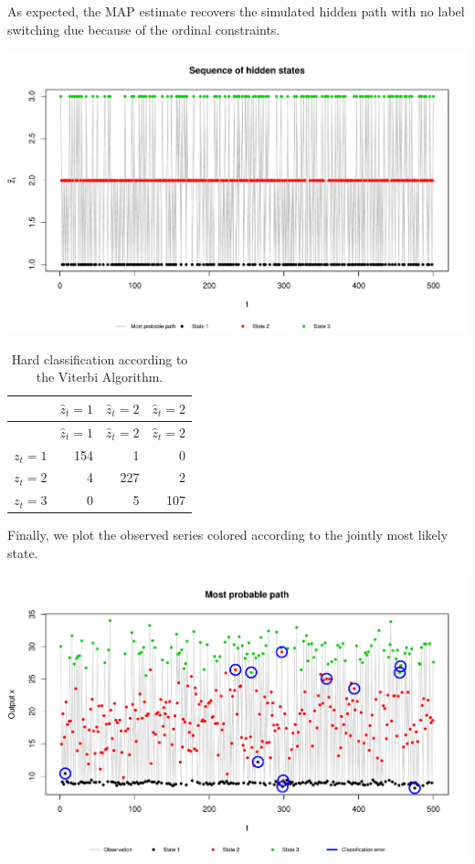 \documentclass[]{article}
\begin{document}
As expected, the MAP estimate recovers the simulated hidden path with no
label switching due because of the ordinal constraints.

\includegraphics[width=\textwidth]{main_pdf_files/figure-latex/hmm_walkthrough_statepath-1}

\begin{longtable}[]{@{}lrrr@{}}
\caption{Hard classification according to the Viterbi
Algorithm.}\tabularnewline
\toprule
& \(\hat{z}_t = 1\) & \(\hat{z}_t = 2\) &
\(\hat{z}_t = 2\)\tabularnewline
\midrule
\endfirsthead
\toprule
& \(\hat{z}_t = 1\) & \(\hat{z}_t = 2\) &
\(\hat{z}_t = 2\)\tabularnewline
\midrule
\endhead
\(z_t = 1\) & 154 & 1 & 0\tabularnewline
\(z_t = 2\) & 4 & 227 & 2\tabularnewline
\(z_t = 3\) & 0 & 5 & 107\tabularnewline
\bottomrule
\end{longtable}

Finally, we plot the observed series colored according to the jointly
most likely state.

\includegraphics[width=\textwidth]{main_pdf_files/figure-latex/hmm_walkthrough_outputvit-1}
\end{document}
